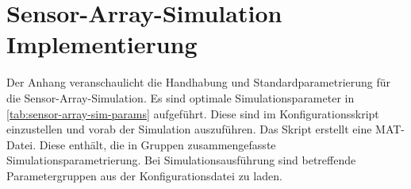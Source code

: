 %

\chapter{Sensor-Array-Simulation Implementierung}\label{ch:sensor-array-sim-imp}


Der Anhang veranschaulicht die Handhabung und Standardparametrierung für die Sensor-Array-Simulation. Es sind optimale Simulationsparameter in \autoref{tab:sensor-array-sim-params} aufgeführt. Diese sind im Konfigurationsskript einzustellen und vorab der Simulation auszuführen. Das Skript erstellt eine MAT-Datei. Diese enthält, die in Gruppen zusammengefasste Simulationsparametrierung. Bei Simulationsausführung sind betreffende Parametergruppen aus der Konfigurationsdatei zu laden.



